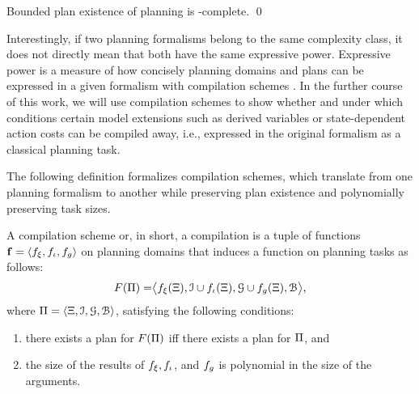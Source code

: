 \begin{theorem}
  \label{thm:bounded-plan-existence}
  Bounded plan existence of planning is \PSPACE{}-complete. \qed
\end{theorem}

Interestingly, if two planning formalisms belong to the same complexity class, it does not directly mean that both have the same expressive power.
Expressive power is a measure of how concisely planning domains and plans can be expressed in a given formalism with compilation schemes \autocite{nebel-jair2000}. In the further course of this work, we will use compilation schemes to show whether and under which conditions certain model extensions such as derived variables or state-dependent action costs can be compiled away, i.e., expressed in the original formalism as a classical planning task.

The following definition formalizes compilation schemes, which translate from one planning formalism to another while preserving plan existence and polynomially preserving task sizes.

\begin{definition}
  \label{def:compilation-scheme}
  A compilation scheme or, in short, a compilation is a tuple of functions ${\text{\textbf{f}}} = \langle f_{\xi}, f_{\iota}, f_{g} \rangle$ on planning domains that induces a function on planning tasks as follows:
  \[F(\Pi) =  \bigr\langle
    f_{\xi}({\Xi}), \mathcal I \cup f_{\iota}({\Xi}) ,
    \mathcal G \cup f_{g}({\Xi}), \mathcal B \bigr\rangle\text{,}\] where $\Pi = \langle {\Xi}, \mathcal I, \mathcal G, \mathcal B \rangle$, satisfying the following conditions:
  \begin{enumerate}
    \item\label{I:compilation:reduction}
          there exists a plan for $F(\Pi)$ iff there exists a plan for $\Pi$, and
    \item\label{II:compilation:size}
          the size of the results of $f_{\xi}, f_{\iota}$, and $f_{g}$ is polynomial in the size of the arguments.
  \end{enumerate}
\end{definition}

